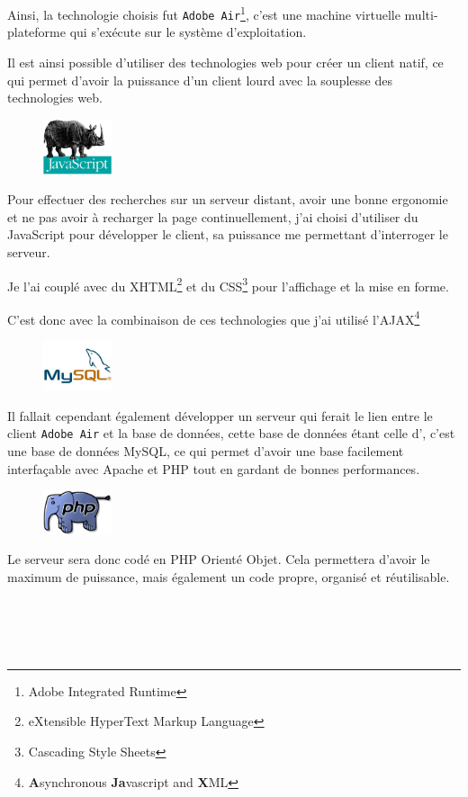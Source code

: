          Ainsi, la technologie choisis fut \texttt{Adobe Air}\footnote{Adobe Integrated Runtime}, c'est une machine virtuelle multi-plateforme qui s'exécute sur le système d'exploitation.

        Il est ainsi possible d'utiliser des technologies web pour créer un client natif, ce qui permet d'avoir la puissance d'un client lourd avec la souplesse des technologies web.
        \newpage
       \begin{figure}
            \includegraphics[width=2.0cm]{images/2-activite/javascript.jpg}
        \end{figure}
        Pour effectuer des recherches sur un serveur distant, avoir une bonne ergonomie et ne pas avoir à recharger la page continuellement, j'ai choisi d'utiliser du JavaScript pour développer le client,
        sa puissance me permettant d'interroger le serveur.

        Je l'ai couplé avec du XHTML\footnote{eXtensible HyperText Markup Language} et du CSS\footnote{Cascading Style Sheets} pour l'affichage et la mise en forme.

        C'est donc avec la combinaison de ces technologies que j'ai utilisé l'AJAX\footnote{\textbf{A}synchronous \textbf{Ja}vascript and \textbf{X}ML}\\

     \begin{figure}
           \includegraphics[width=2cm]{images/2-activite/mysql.jpg}
     \end{figure}
        Il fallait cependant également développer un serveur qui ferait le lien entre le client \texttt{Adobe Air} et la base de données, cette base de données étant celle d'\adt{}, c'est une base de données MySQL, ce qui permet d'avoir une base facilement interfaçable avec Apache et PHP tout en gardant de bonnes performances.\\

     \begin{figure}\vspace{-5px}
           \includegraphics[width=2cm]{images/2-activite/php.png}
      \end{figure}
        Le serveur sera donc codé en PHP Orienté Objet. Cela permettera d'avoir le maximum de puissance, mais également un code propre, organisé et réutilisable. \\~\\~\\~\\~~


